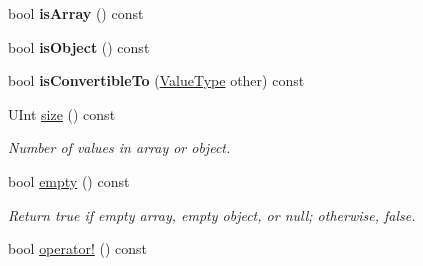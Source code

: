 \begin{DoxyCompactItemize}
\item 
\hypertarget{protocol_json_1_1_j_s_o_n___a_p_i_a6afef1570befb40341239347856d9e59}{bool {\bfseries is\-Array} () const }\label{protocol_json_1_1_j_s_o_n___a_p_i_a6afef1570befb40341239347856d9e59}

\item 
\hypertarget{protocol_json_1_1_j_s_o_n___a_p_i_a67e726c5b4ce4a58890cc97ba8b29207}{bool {\bfseries is\-Object} () const }\label{protocol_json_1_1_j_s_o_n___a_p_i_a67e726c5b4ce4a58890cc97ba8b29207}

\item 
\hypertarget{protocol_json_1_1_j_s_o_n___a_p_i_abc53ac28592be34fea30939b6b4aaf84}{bool {\bfseries is\-Convertible\-To} (\hyperlink{namespace_json_a7d654b75c16a57007925868e38212b4e}{Value\-Type} other) const }\label{protocol_json_1_1_j_s_o_n___a_p_i_abc53ac28592be34fea30939b6b4aaf84}

\item 
\hypertarget{protocol_json_1_1_j_s_o_n___a_p_i_a59da16946e6731036931b55a99a75515}{U\-Int \hyperlink{protocol_json_1_1_j_s_o_n___a_p_i_a59da16946e6731036931b55a99a75515}{size} () const }\label{protocol_json_1_1_j_s_o_n___a_p_i_a59da16946e6731036931b55a99a75515}

\begin{DoxyCompactList}\small\item\em Number of values in array or object. \end{DoxyCompactList}\item 
\hypertarget{protocol_json_1_1_j_s_o_n___a_p_i_ac4df215181adfe71317a5a378ebca834}{bool \hyperlink{protocol_json_1_1_j_s_o_n___a_p_i_ac4df215181adfe71317a5a378ebca834}{empty} () const }\label{protocol_json_1_1_j_s_o_n___a_p_i_ac4df215181adfe71317a5a378ebca834}

\begin{DoxyCompactList}\small\item\em Return true if empty array, empty object, or null; otherwise, false. \end{DoxyCompactList}\item 
\hypertarget{protocol_json_1_1_j_s_o_n___a_p_i_a3c4925561838c0a32698efeea2c983d6}{bool \hyperlink{protocol_json_1_1_j_s_o_n___a_p_i_a3c4925561838c0a32698efeea2c983d6}{operator!} () const }\label{protocol_json_1_1_j_s_o_n___a_p_i_a3c4925561838c0a32698efeea2c983d6}


\end{DoxyCompactItemize}
